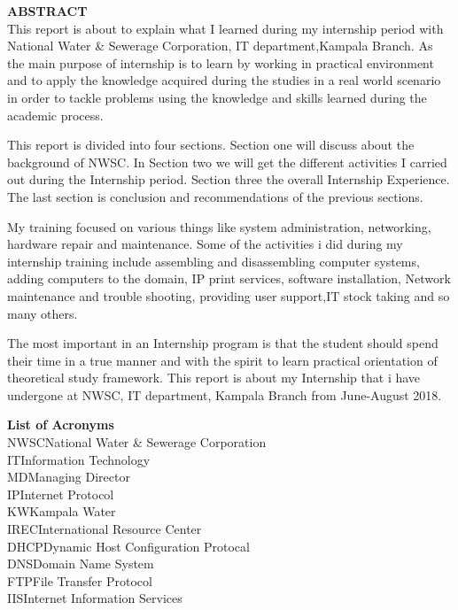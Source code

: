\documentclass{article}
\begin{document}
\newpage
\textbf{ABSTRACT}\\
This report is about to explain what I learned during my internship period with National Water \& Sewerage Corporation, IT department,Kampala Branch. As the main purpose of internship is to learn by working in practical environment and to apply the knowledge acquired during the studies in a real world scenario in order to tackle problems using the knowledge and skills learned during the academic process.
\par This report is divided into four  sections. Section one will discuss about the background of NWSC. In Section two we will get the different activities I carried out during the Internship period. Section three the overall Internship Experience. The last section is conclusion and recommendations of the previous sections.
\par My training focused on various things like system administration, networking, hardware repair and maintenance. Some of the activities i did during my internship training include assembling and disassembling computer systems, adding computers to the domain, IP print services, software installation, Network maintenance and trouble shooting, providing user support,IT stock taking  and so many others.
\par The most important in an Internship program is that the student should spend their time in a true manner and with the spirit to learn practical orientation of theoretical study framework. This report is about my Internship that i have undergone at NWSC, IT department, Kampala Branch from June-August 2018.
\newpage
\tableofcontents
\thispagestyle{empty}
\cleardoublepage
\setcounter{page}{1}
\newpage
\begin{appendix}
\listoffigures
\newpage
\listoftables
\end{appendix}
\newpage
\textbf{List of Acronyms}\\
NWSC\dotfill  National Water \& Sewerage Corporation\\
IT\dotfill Information Technology\\
MD\dotfill Managing Director\\
IP\dotfill Internet Protocol\\
KW\dotfill Kampala Water\\
IREC\dotfill International Resource Center\\
DHCP\dotfill Dynamic Host Configuration Protocal\\
DNS\dotfill Domain Name System\\
FTP\dotfill File Transfer Protocol\\
IIS\dotfill Internet Information Services\\
\end{document}

